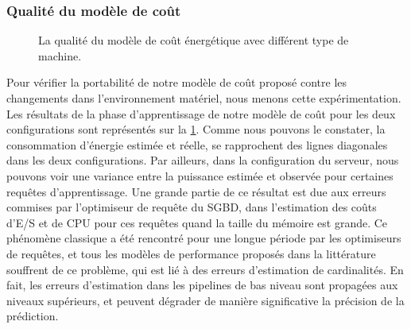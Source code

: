 \subsubsection{Qualité du modèle de coût}\label{subsubsec:SolutionsQualityPostgres}
\begin{figure}
  \centering
  \quad
  \caption{La qualité du modèle de coût énergétique avec différent type de machine.}\label{fig:tpch-reg-postgres}
\end{figure}

Pour vérifier la portabilité de notre modèle de coût proposé contre les changements dans l'environnement matériel, nous menons cette expérimentation.
Les résultats de la phase d'apprentissage de notre modèle de coût pour les deux configurations sont représentés sur la \ref{fig:tpch-reg-postgres}. Comme nous pouvons le constater, la consommation d'énergie estimée et réelle, se rapprochent des lignes diagonales dans les deux configurations. Par ailleurs, dans la configuration du serveur, nous pouvons voir une variance entre la puissance estimée et observée pour certaines requêtes d'apprentissage. Une grande partie de ce résultat est due aux erreurs commises par l'optimiseur de requête du SGBD, dans l'estimation des coûts d'E/S et de CPU pour ces requêtes quand la taille du mémoire est grande. Ce phénomène classique a été rencontré pour une longue période par les optimiseurs de requêtes, et tous les modèles de performance proposés dans la littérature souffrent de ce problème, qui est lié à des erreurs d'estimation de cardinalités. En fait, les erreurs d'estimation dans les pipelines de bas niveau sont propagées aux niveaux supérieurs, et peuvent dégrader de manière significative la précision de la prédiction.

